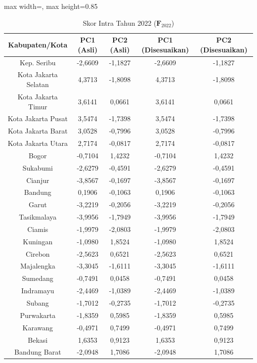 \begin{table}[H]
\centering
\caption{Skor Intra Tahun 2022 ($\mathbf{F}_{2022}$)} \label{tab:app1skor_intra_2022}
\begin{adjustbox}{max width=\textwidth, max height=0.85\textheight}
\begin{tabular}{|c|c|c|c|c|}
\hline
\textbf{Kabupaten/Kota} & \textbf{PC1 (Asli)} & \textbf{PC2 (Asli)} & \textbf{PC1 (Disesuaikan)} & \textbf{PC2 (Disesuaikan)} \\
\hline
Kep. Seribu & -2,6609 & -1,1827 & -2,6609 & -1,1827 \\
Kota Jakarta Selatan & 4,3713 & -1,8098 & 4,3713 & -1,8098 \\
Kota Jakarta Timur & 3,6141 & 0,0661 & 3,6141 & 0,0661 \\
Kota Jakarta Pusat & 3,5474 & -1,7398 & 3,5474 & -1,7398 \\
Kota Jakarta Barat & 3,0528 & -0,7996 & 3,0528 & -0,7996 \\
Kota Jakarta Utara & 2,7174 & -0,0817 & 2,7174 & -0,0817 \\
Bogor & -0,7104 & 1,4232 & -0,7104 & 1,4232 \\
Sukabumi & -2,6279 & -0,4591 & -2,6279 & -0,4591 \\
Cianjur & -3,8567 & -0,1697 & -3,8567 & -0,1697 \\
Bandung & 0,1906 & -0,1063 & 0,1906 & -0,1063 \\
Garut & -3,2219 & -0,2056 & -3,2219 & -0,2056 \\
Tasikmalaya & -3,9956 & -1,7949 & -3,9956 & -1,7949 \\
Ciamis & -1,9979 & -2,0803 & -1,9979 & -2,0803 \\
Kuningan & -1,0980 & 1,8524 & -1,0980 & 1,8524 \\
Cirebon & -2,5623 & 0,6521 & -2,5623 & 0,6521 \\
Majalengka & -3,3045 & -1,6111 & -3,3045 & -1,6111 \\
Sumedang & -0,7491 & 0,0458 & -0,7491 & 0,0458 \\
Indramayu & -2,4469 & -1,0389 & -2,4469 & -1,0389 \\
Subang & -1,7012 & -0,2735 & -1,7012 & -0,2735 \\
Purwakarta & -1,8359 & 0,5985 & -1,8359 & 0,5985 \\
Karawang & -0,4971 & 0,7499 & -0,4971 & 0,7499 \\
Bekasi & 1,6353 & 0,9123 & 1,6353 & 0,9123 \\
Bandung Barat & -2,0948 & 1,7086 & -2,0948 & 1,7086 \\

\end{tabular}
\end{adjustbox}
\end{table}
